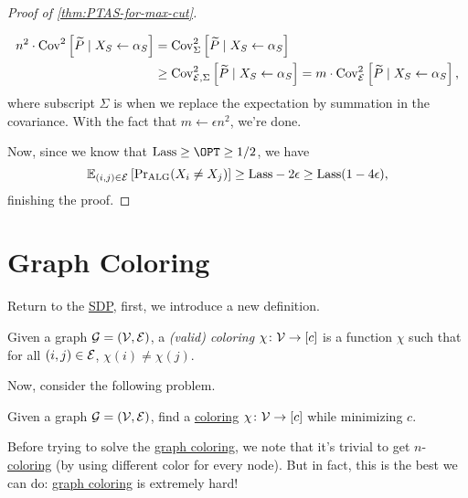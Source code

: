 \begin{proof}[Proof of \autoref{thm:PTAS-for-max-cut}]
\begin{explanation}
\[\begin{split}
				n^2\cdot \mathop{\mathrm{Cov}}\nolimits_{}^2\left[\widetilde{P} \mid X_S \gets \alpha _S \right]
				&= \mathop{\mathrm{Cov}}\nolimits_{\Sigma }^2\left[\widetilde{P} \mid X_S\gets \alpha _S \right] \\
				&\geq \mathop{\mathrm{Cov}}\nolimits_{\mathcal{\MakeUppercase{e}} , \Sigma }^2\left[\widetilde{P} \mid X_S\gets \alpha _S \right]
				= m \cdot \mathop{\mathrm{Cov}}\nolimits_{\mathcal{\MakeUppercase{e}} }^2\left[\widetilde{P} \mid X_S \gets \alpha _S \right],
			\end{split}
		\]
		where subscript \(\Sigma \) is when we replace the expectation by summation in the covariance. With the fact that \(m\gets \epsilon n^2\), we're done.
	\end{explanation}
	Now, since we know that \(\mathrm{Lass} \geq \OPT \geq 1 / 2\), we have
	\[
		\mathbb{E}_{(i, j)\in \mathcal{\MakeUppercase{e}} }\left[ \Pr\nolimits_{\mathrm{ALG}}(X_i \neq X_j) \right]
		\geq \mathrm{Lass} - 2 \epsilon \geq \mathrm{Lass}(1 - 4 \epsilon ),
	\]
	finishing the proof.
\end{proof}

\section{Graph Coloring}
Return to the \hyperref[def:SDP]{SDP}, first, we introduce a new definition.

\begin{definition}[Coloring]\label{def:coloring}
	Given a graph \(\mathcal{\MakeUppercase{g}} =(\mathcal{\MakeUppercase{v}} , \mathcal{\MakeUppercase{e}} )\), a \emph{(valid) coloring} \(\chi \colon \mathcal{\MakeUppercase{v}} \to [c]\) is a function \(\chi \) such that for all \((i, j)\in \mathcal{\MakeUppercase{e}} \), \(\chi (i) \neq \chi (j)\).
\end{definition}

Now, consider the following problem.

\begin{problem}\label{prb:graph-coloring}
Given a graph \(\mathcal{\MakeUppercase{g}} =(\mathcal{\MakeUppercase{v}} , \mathcal{\MakeUppercase{e}} )\), find a \hyperref[def:coloring]{coloring} \(\chi \colon \mathcal{\MakeUppercase{v}} \to [c]\) while minimizing \(c\).
\end{problem}

Before trying to solve the \hyperref[prb:graph-coloring]{graph coloring}, we note that it's trivial to get \(n\)-\hyperref[def:coloring]{coloring} (by using different color for every node). But in fact, this is the best we can do: \hyperref[prb:graph-coloring]{graph coloring} is extremely hard!

